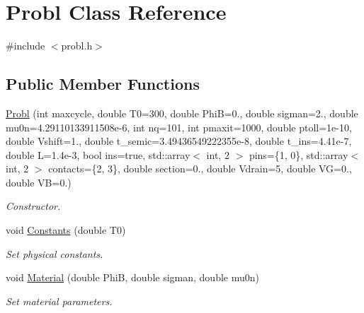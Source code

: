 \hypertarget{class_probl}{}\section{Probl Class Reference}
\label{class_probl}


{\ttfamily \#include $<$probl.\+h$>$}

\subsection*{Public Member Functions}
\begin{DoxyCompactItemize}
\item 
\mbox{\label{class_probl_a10c8dcc131ffcc3bcf2af590323ba961}} 
\mbox{\hyperlink{class_probl_a10c8dcc131ffcc3bcf2af590323ba961}{Probl}} (int maxcycle, double T0=300, double PhiB=0., double sigman=2., double mu0n=4.\+29110133911508e-\/6, int nq=101, int pmaxit=1000, double ptoll=1e-\/10, double Vshift=1., double t\+\_\+semic=3.\+49436549222355e-\/8, double t\+\_\+ins=4.\+41e-\/7, double L=1.\+4e-\/3, bool ins=true, std\+::array$<$ int, 2 $>$ pins=\{1, 0\}, std\+::array$<$ int, 2 $>$ contacts=\{2, 3\}, double section=0., double Vdrain=5, double V\+G=0., double V\+B=0.)
\begin{DoxyCompactList}\small\item\em Constructor. \end{DoxyCompactList}\item 
\mbox{\label{class_probl_ab73c319317dcb9cce6b491b0d13ed882}} 
void \mbox{\hyperlink{class_probl_ab73c319317dcb9cce6b491b0d13ed882}{Constants}} (double T0)
\begin{DoxyCompactList}\small\item\em Set physical constants. \end{DoxyCompactList}\item 
\mbox{\label{class_probl_af3f026d191bae1943873bd6cb150aedc}} 
void \mbox{\hyperlink{class_probl_af3f026d191bae1943873bd6cb150aedc}{Material}} (double PhiB, double sigman, double mu0n)
\begin{DoxyCompactList}\small\item\em Set material parameters. \end{DoxyCompactList}\item 
\mbox{\label{class_probl_a20e64318e853ac58c258c4c1d20a2315}} 

\end{DoxyCompactItemize}
